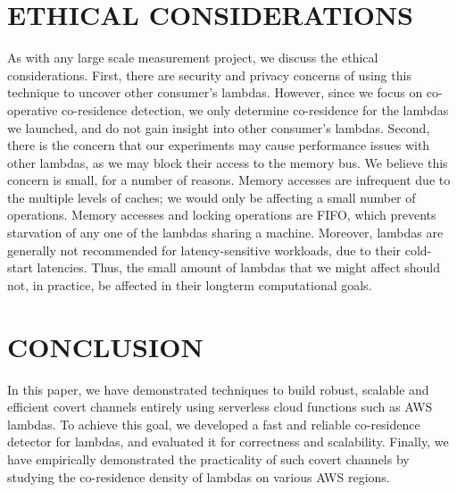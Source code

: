 
\section{ETHICAL CONSIDERATIONS}
As with any large scale measurement project, we discuss the ethical
considerations. First, there are security and privacy concerns of using this
technique to uncover other consumer's lambdas. However, since we focus on
co-operative co-residence detection, we only determine co-residence for the
lambdas we launched, and do not gain insight into other consumer's lambdas.
Second, there is the concern that our experiments may cause performance issues with
other lambdas, as we may block their access to the memory bus. We believe this
concern is small, for a number of reasons. Memory accesses are infrequent due to
the multiple levels of caches; we would only be affecting a small number of
operations. Memory accesses and locking operations are FIFO, which prevents
starvation of any one of the lambdas sharing a machine. Moreover, lambdas are
generally not recommended for latency-sensitive workloads, due to their
cold-start latencies. Thus, the small amount of lambdas that we might affect
should not, in practice, be affected in their longterm computational goals. 


\section{CONCLUSION}
\label{sec:conclusion}
In this paper, we have demonstrated techniques to build robust, scalable and 
efficient covert channels entirely using serverless cloud functions such as 
AWS lambdas. To achieve this goal, we developed a fast and reliable co-residence 
detector for lambdas, and evaluated it for correctness and scalability.
Finally, we have empirically demonstrated the practicality of such covert 
channels by studying the co-residence density of lambdas on various AWS regions. 


